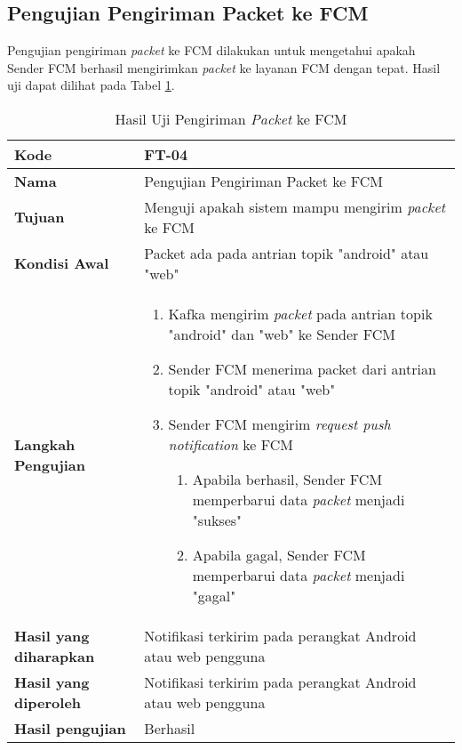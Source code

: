 \subsection{Pengujian Pengiriman Packet ke FCM}
\par Pengujian pengiriman \textit{packet} ke FCM dilakukan untuk mengetahui apakah Sender FCM berhasil mengirimkan \textit{packet} ke layanan FCM dengan tepat. Hasil uji dapat dilihat pada Tabel \ref{t:uji_pengiriman_packet_fcm}.
\begin{longtable}{|p{3cm}|p{6.5cm}|}
	\caption{Hasil Uji Pengiriman \textit{Packet} ke FCM} \label{t:uji_pengiriman_packet_fcm} \\ \hline
	\textbf{Kode} & FT-04 \\ \hline
	\textbf{Nama} & Pengujian Pengiriman Packet ke FCM \\ \hline
	\textbf{Tujuan} & Menguji apakah sistem mampu mengirim \textit{packet} ke FCM \\ \hline
	\textbf{Kondisi Awal} &  Packet ada pada antrian topik "android" atau "web"\\ \hline
	\textbf{Langkah Pengujian} &  
	\begin{enumerate}
		\item Kafka mengirim \textit{packet} pada antrian topik "android" dan "web" ke Sender FCM
		\item Sender FCM menerima packet dari antrian topik "android" atau "web"
		\item Sender FCM mengirim \textit{request push notification} ke FCM
		\begin{enumerate}
			\item Apabila berhasil, Sender FCM memperbarui data \textit{packet} menjadi "sukses"
			\item Apabila gagal, Sender FCM memperbarui data \textit{packet} menjadi "gagal"
		\end{enumerate}
	\end{enumerate} \\ \hline
	\textbf{Hasil yang diharapkan} & Notifikasi terkirim pada perangkat Android atau web pengguna \\ \hline
	\textbf{Hasil yang diperoleh} & Notifikasi terkirim pada perangkat Android atau web pengguna \\ \hline
	\textbf{Hasil pengujian} & Berhasil \\ \hline
\end{longtable}

